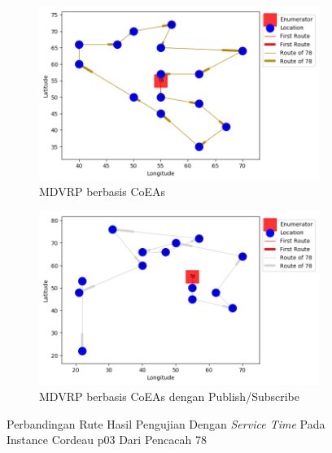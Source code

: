 \begin{figure}[H]
	\centering
	\begin{subfigure}[t]{\textwidth}
		\centering
		\includegraphics[width=\textwidth]{Resources/Images/cordeau_p03_tw/cordeau_p03_tw_78_coes}
		\caption{MDVRP berbasis CoEAs}
		\label{fig:cordeau_p03_tw_78_coes}
	\end{subfigure}
	\begin{subfigure}[t]{\textwidth}
		\centering
		\includegraphics[width=\textwidth]{Resources/Images/cordeau_p03_tw/cordeau_p03_tw_78_pubsub_coes}
		\caption{MDVRP berbasis CoEAs dengan Publish/Subscribe}
		\label{fig:cordeau_p03_tw_78_pubsub_coes}
	\end{subfigure}
	\caption{Perbandingan Rute Hasil Pengujian Dengan \textit{Service Time} Pada Instance Cordeau p03 Dari Pencacah 78}
	\label{fig:cordeau_p03_tw_78}
\end{figure}


